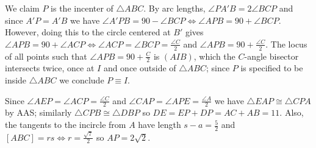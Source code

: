 \begin{solution}\hfil\medskip
  
    \begin{figure}[h!]
        \centering
    \end{figure}

    We claim $P$ is the incenter of $\triangle ABC$. By arc lengths, $\angle{PA'B} = 2 \angle BCP$ and since $A'P = A'B$ we have $\angle A'PB = 90 - \angle BCP \iff \angle APB = 90 + \angle BCP$.
    However, doing this to the circle centered at $B'$ gives $\angle APB = 90 + \angle ACP \iff \angle ACP = \angle BCP = \frac{\angle C}{2}$ and $\angle APB = 90 + \frac{\angle C}{2}$.
    The locus of all points such that $\angle APB = 90 + \frac{C}{2}$ is $(AIB)$, which the $C$-angle bisector intersects twice, once at $I$ and once outside of $\triangle ABC$; since $P$
    is specified to be inside $\triangle ABC$ we conclude $P \equiv I$. \medskip

    Since $\angle AEP = \angle ACP = \frac{\angle C}{2}$ and $\angle CAP = \angle APE = \frac{\angle A}{2}$ we have $\triangle{EAP} \cong \triangle CPA$ by AAS;
    similarly $\triangle CPB \cong \triangle DBP$ so $DE = EP + DP = AC + AB = 11$. Also, the tangents to the incircle from $A$ have length $s - a = \frac{5}{2}$
    and $[ABC] = rs \iff r = \frac{\sqrt7}{2}$ so $AP = 2 \sqrt 2$. 
\end{solution}\bigskip


